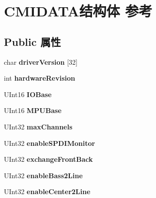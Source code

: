 \hypertarget{struct_c_m_i_d_a_t_a}{}\section{C\+M\+I\+D\+A\+T\+A结构体 参考}
\label{struct_c_m_i_d_a_t_a}
\subsection*{Public 属性}
\begin{DoxyCompactItemize}
\item 
\mbox{\label{struct_c_m_i_d_a_t_a_a7ffa7155688dc0733fed9a7851326b7a}} 
char {\bfseries driver\+Version} \mbox{[}32\mbox{]}
\item 
\mbox{\label{struct_c_m_i_d_a_t_a_a1c39eccd46ea3969653dcab9ed54576a}} 
int {\bfseries hardware\+Revision}
\item 
\mbox{\label{struct_c_m_i_d_a_t_a_a6d1a187e5bc4d26f36f0fdd5cc22814d}} 
U\+Int16 {\bfseries I\+O\+Base}
\item 
\mbox{\label{struct_c_m_i_d_a_t_a_ac35a786ad0da8d6bbc68daba4b3f87ed}} 
U\+Int16 {\bfseries M\+P\+U\+Base}
\item 
\mbox{\label{struct_c_m_i_d_a_t_a_ad569e7311ac8d7e94916b40efdb8fe7b}} 
U\+Int32 {\bfseries max\+Channels}
\item 
\mbox{\label{struct_c_m_i_d_a_t_a_a56e516694d702a98522ceff5404ef211}} 
U\+Int32 {\bfseries enable\+S\+P\+D\+I\+Monitor}
\item 
\mbox{\label{struct_c_m_i_d_a_t_a_aa518cb1e7099304054176cc8cec3d078}} 
U\+Int32 {\bfseries exchange\+Front\+Back}
\item 
\mbox{\label{struct_c_m_i_d_a_t_a_a0eb7f62150a7c51e13c2a34eaa6e6586}} 
U\+Int32 {\bfseries enable\+Bass2\+Line}
\item 
\mbox{\label{struct_c_m_i_d_a_t_a_a56c0c21df467568694e8dc0779e7bc0e}} 
U\+Int32 {\bfseries enable\+Center2\+Line}

\end{DoxyCompactItemize}
